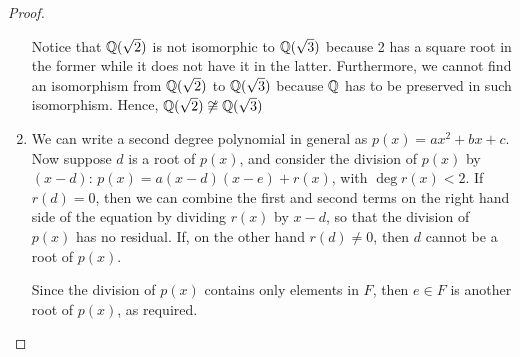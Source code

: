 \begin{proof}
\begin{enumerate}
    Notice that $\mathbb{Q}(\sqrt{2})$ is not isomorphic to $\mathbb{Q}(\sqrt{3})$ because 2 has a square root in the former while it does not have it in the latter. Furthermore, we cannot find an isomorphism from $\mathbb{Q}(\sqrt{2})$ to $\mathbb{Q}(\sqrt{3})$ because $\mathbb{Q}$ has to be preserved in such isomorphism. Hence, $\mathbb{Q}(\sqrt{2})\not\cong\mathbb{Q}(\sqrt{3})$
    \item We can write a second degree polynomial in general as $p(x)=ax^2+bx+c$. Now suppose $d$ is a root of $p(x)$, and consider the division of $p(x)$ by $(x-d)$: $p(x)=a(x-d)(x-e)+r(x)$, with $\deg r(x)<2$. If $r(d)=0$, then we can combine the first and second terms on the right hand side of the equation by dividing $r(x)$ by $x-d$, so that the division of $p(x)$ has no residual. If, on the other hand $r(d)\neq 0$, then $d$ cannot be a root of $p(x)$.

    Since the division of $p(x)$ contains only elements in $F$, then $e\in F$ is another root of $p(x)$, as required.
 \end{enumerate}
\end{proof}

